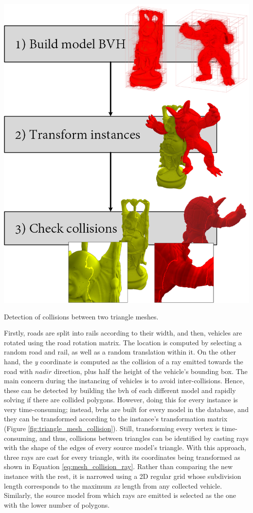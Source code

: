 \begin{marginfigure} [8.cm]
	\centering
	\includegraphics[width=\linewidth]{figs/lidar_simulation/mesh_collision.png}
	\caption{Detection of collisions between two triangle meshes. }
	\label{fig:triangle_mesh_collision}
\end{marginfigure}
Firstly, roads are split into rails according to their width, and then, vehicles are rotated using the road rotation matrix. The location is computed by selecting a random road and rail, as well as a random translation within it. On the other hand, the \textit{y} coordinate is computed as the collision of a ray emitted towards the road with $\textit{nadir}$ direction, plus half the height of the vehicle's bounding box. The main concern during the instancing of vehicles is to avoid inter-collisions. Hence, these can be detected by building the \acrshort{bvh} of each different model and rapidly solving if there are collided polygons. However, doing this for every instance is very time-consuming; instead, \acrshort{bvh}s are built for every model in the database, and they can be transformed according to the instance's transformation matrix (Figure \ref{fig:triangle_mesh_collision}). Still, transforming every vertex is time-consuming, and thus, collisions between triangles can be identified by casting rays with the shape of the edges of every source model's triangle. With this approach, three rays are cast for every triangle, with its coordinates being transformed as shown in Equation \ref{eq:mesh_collision_ray}. Rather than comparing the new instance with the rest, it is narrowed using a 2D regular grid whose subdivision length corresponds to the maximum \textit{xz} length from any collected vehicle. Similarly, the source model from which rays are emitted is selected as the one with the lower number of polygons.
